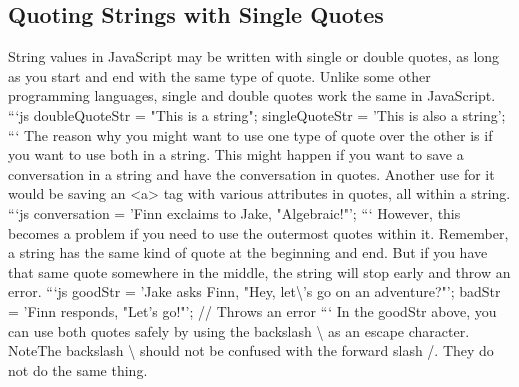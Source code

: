 \documentclass{article}%
\begin{document}
\subsection{Quoting Strings with Single Quotes}%
\label{subsec:QuotingStringswithSingleQuotes}%
String values in JavaScript may be written with single or double quotes, as long as you start and end with the same type of quote. Unlike some other programming languages, single and double quotes work the same in JavaScript.\newline%
```js\newline%
doubleQuoteStr = "This is a string"; \newline%
singleQuoteStr = 'This is also a string';\newline%
```\newline%
The reason why you might want to use one type of quote over the other is if you want to use both in a string. This might happen if you want to save a conversation in a string and have the conversation in quotes. Another use for it would be saving an <a> tag with various attributes in quotes, all within a string.\newline%
```js\newline%
conversation = 'Finn exclaims to Jake, "Algebraic!"';\newline%
```\newline%
However, this becomes a problem if you need to use the outermost quotes within it. Remember, a string has the same kind of quote at the beginning and end. But if you have that same quote somewhere in the middle, the string will stop early and throw an error.\newline%
```js\newline%
goodStr = 'Jake asks Finn, "Hey, let\textbackslash{}'s go on an adventure?"'; \newline%
badStr = 'Finn responds, "Let's go!"'; // Throws an error\newline%
```\newline%
In the goodStr above, you can use both quotes safely by using the backslash \textbackslash{} as an escape character.\newline%
NoteThe backslash \textbackslash{} should not be confused with the forward slash /. They do not do the same thing.\newline%

%
\end{document}
